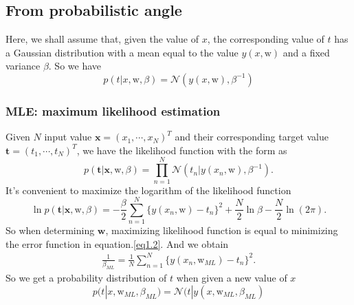 \documentclass{article}
\newcommand{\normD}{\mathcal{N}}
\newcommand{\mrm}{\mathrm}
\newcommand{\mbf}{\mathbf}
\begin{document}
\subsection*{From probabilistic angle}
Here, we shall assume that, given the value of $x$, the corresponding value of $t$ has a Gaussian distribution with a mean equal to the value $y(x,\mrm{w})$ and a fixed variance $\beta$. So we have 
\begin{equation}
    p(t|x, \mrm w, \beta) = \normD(y(x, \mrm w), \beta^{-1}) \tag{1.4}
\end{equation}

\subsubsection*{MLE: maximum likelihood estimation}
Given $N$ input value $\mbf{x} = (x_1,\cdots, x_N)^T$ and their corresponding target value $\mbf t= (t_1, \cdots, t_N)^T$, we have the likelihood function with the form as 
\begin{equation}
    p(\mbf t|\mbf x, \mrm w, \beta) = \prod_{n=1}^N\normD(t_n|y(x_n,\mrm w),\beta^{-1}). \tag{1.5}
\end{equation}
It's convenient to maximize the logarithm of the likelihood function
\begin{equation}
    \ln p(\mbf t|\mbf x, \mrm w, \beta) = -\frac{\beta}{2}\sum_{n=1}^N\{y(x_n,\mrm w)-t_n\}^2+\frac N2\ln\beta-\frac N2\ln(2\pi). \tag{1.6}
\end{equation}
So when determining $\mbf w$, maximizing likelihood function is equal to minimizing the error function in equation.\ref{eq1.2}. And we obtain
\begin{gather}
    \frac1{\beta_{ML}} = \frac1N\sum_{n=1}^N\{y(x_n,\mrm w_{ML})-t_n\}^2. \tag{1.7}
\end{gather}
So we get a probability distribution of $t$ when given a new value of $x$
\begin{equation}
    p(t|x,\mrm w_{ML},\beta_{ML}) = \normD(t|y(x,\mrm w_{ML},\beta_{ML}) \tag{1.8}
\end{equation}
\end{document}
